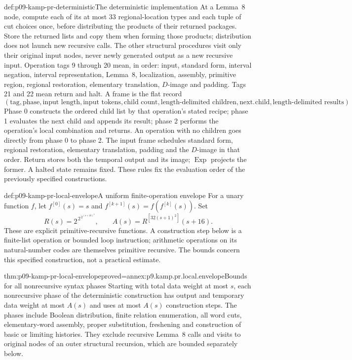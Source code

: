 \begin{hbdefinition}{def:p09-kamp-pr-deterministic}{The deterministic implementation}
At a Lemma~8 node, compute each of its at most 33 regional-location
types and each tuple of cut choices once, before distributing the
products of their returned packages. Store the returned lists and copy
them when forming those products; distribution does not launch new
recursive calls. The other structural procedures visit only their
original input nodes, never newly generated output as a new recursive
input. Operation tags 9 through 20 mean, in order: input, standard
form, interval negation, interval representation, Lemma~8, localization,
assembly, primitive region, regional restoration, elementary translation,
\(D\)-image and padding. Tags 21 and 22 mean return and halt.
A frame is the flat record
\[
 (\text{tag},\text{phase},\text{input length},\text{input tokens},
   \text{child count},\text{length-delimited children},
   \text{next child},\text{length-delimited results}).
\]
Phase 0 constructs the ordered child list by that operation's stated
recipe; phase 1 evaluates the next child and appends its result;
phase 2 performs the operation's local combination and returns.
An operation with no children goes directly from phase 0 to phase 2.
The input frame schedules standard form, regional restoration,
elementary translation, padding and the \(D\)-image in that order.
Return stores both the temporal output and its image; \(\operatorname{Exp}\)
projects the former. A halted state remains fixed. These rules fix
the evaluation order of the previously specified constructions.
\end{hbdefinition}

\begin{hbdefinition}{def:p09-kamp-pr-local-envelope}{A uniform finite-operation envelope}
For a unary function \(f\), let
\(f^{[0]}(s)=s\) and \(f^{[k+1]}(s)=f(f^{[k]}(s))\).
Set
\[
 R(s)=2^{\,2^{\,2^{(s+16)^4}}},\qquad
 A(s)=R^{[32(s+1)^2]}(s+16).
\]
These are explicit primitive-recursive functions. A construction step
below is a finite-list operation or bounded loop instruction; arithmetic
operations on its natural-number codes are themselves primitive recursive.
The bounds concern this specified construction, not a practical estimate.
\end{hbdefinition}

\begin{hblemma}{thm:p09-kamp-pr-local-envelope}{proved=annex:p9.kamp.pr.local.envelope}{Bounds for all nonrecursive syntax phases}
Starting with total data weight at most \(s\), each nonrecursive
phase of the deterministic construction has output and temporary data
weight at most \(A(s)\) and uses at most \(A(s)\)
construction steps. The phases include Boolean distribution, finite
relation enumeration, all word cuts, elementary-word assembly, proper
substitution, freshening and construction of basic or limiting histories.
They exclude recursive Lemma~8 calls and visits to original nodes of
an outer structural recursion, which are bounded separately below.
\end{hblemma}

